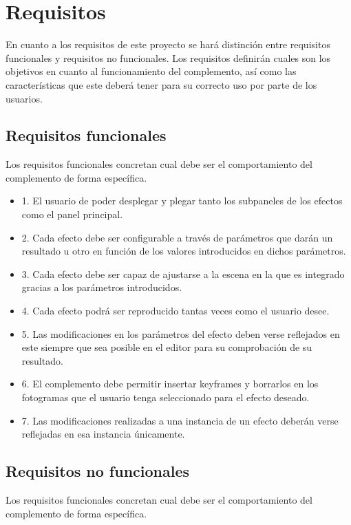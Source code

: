 
\section{Requisitos}
En cuanto a los requisitos de este proyecto se hará distinción entre requisitos funcionales y requisitos no funcionales. Los requisitos definirán cuales son los objetivos en cuanto al funcionamiento del complemento, así como las características que este deberá tener para su correcto uso por parte de los usuarios.
\subsection{Requisitos funcionales}
Los requisitos funcionales concretan cual debe ser el comportamiento del complemento de forma específica.

\begin{itemize}[label={}]
	
	\item 1. El usuario de poder desplegar y plegar tanto los subpaneles de los efectos como el panel principal.
	\item 2. Cada efecto debe ser configurable a través de parámetros que darán un resultado u otro en función de los valores introducidos en dichos parámetros.
	\item 3. Cada efecto debe ser capaz de ajustarse a la escena en la que es integrado gracias a los parámetros introducidos.
	\item 4. Cada efecto podrá ser reproducido tantas veces como el usuario desee. 
	\item 5. Las modificaciones en los parámetros del efecto deben verse reflejados en este siempre que sea posible en el editor para su comprobación de su resultado.
	\item 6. El complemento debe permitir insertar keyframes y borrarlos en los fotogramas que el usuario tenga seleccionado para el efecto deseado.
	\item 7. Las modificaciones realizadas a una instancia de un efecto deberán verse reflejadas en esa instancia únicamente.
\end{itemize}

\subsection{Requisitos no funcionales}
Los requisitos funcionales concretan cual debe ser el comportamiento del complemento de forma específica.

